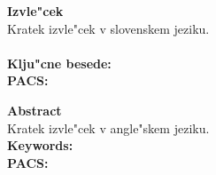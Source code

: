 



\cleardoublepage
{\Large \bf Izvle"cek}
\vspace{1cm}\\
Kratek izvle"cek v slovenskem jeziku.\\
\vspace{1cm}\\
{\bf Klju"cne besede:}\\
{\bf PACS:}


\cleardoublepage
{\Large \bf Abstract}
\vspace{1cm}\\
Kratek izvle"cek v angle"skem jeziku.
\vspace{1cm}\\
{\bf Keywords:}\\
{\bf PACS:}


\tableofcontents





\cleardoublepage


\pagestyle{fancy}
\fancyhead[CE,RE]{}
\fancyhead[LO,CO]{}
\fancyhead[LE]{\textbf{\nouppercase{\leftmark}}}
\fancyhead[RO]{\textbf{\nouppercase{\rightmark}}}






% 
